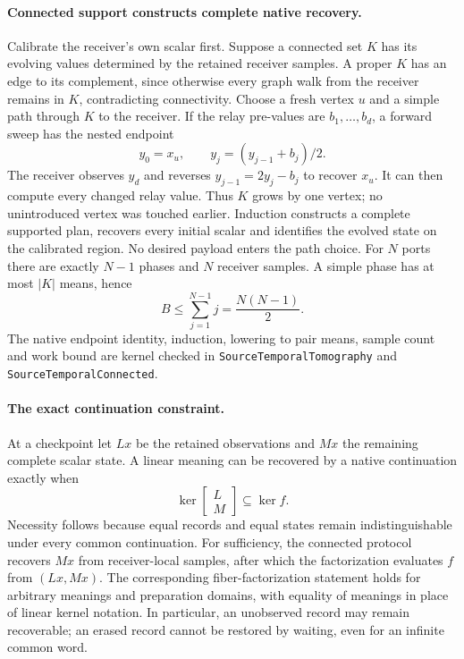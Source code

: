 \paragraph{Connected support constructs complete native recovery.}
Calibrate the receiver's own scalar first. Suppose a connected set $K$ has
its evolving values determined by the retained receiver samples. A proper
$K$ has an edge to its complement, since otherwise every graph walk from
the receiver remains in $K$, contradicting connectivity. Choose a fresh
vertex $u$ and a simple path through $K$ to the receiver. If the relay
pre-values are $b_1,\ldots,b_d$, a forward sweep has the nested endpoint
\[
 y_0=x_u,\qquad y_j=(y_{j-1}+b_j)/2.
\]
The receiver observes $y_d$ and reverses $y_{j-1}=2y_j-b_j$ to recover $x_u$.
It can then compute every changed relay value. Thus $K$ grows by one vertex;
no unintroduced vertex was touched earlier. Induction constructs a complete
supported plan, recovers every initial scalar and identifies the evolved
state on the calibrated region. No desired payload enters the path choice.
For $N$ ports there are exactly $N-1$ phases and $N$ receiver samples.
A simple phase has at most $|K|$ means, hence
\[
 B\leq\sum_{j=1}^{N-1}j=\frac{N(N-1)}2.
\]
The native endpoint identity, induction, lowering to pair means, sample count
and work bound are kernel checked in \texttt{SourceTemporalTomography} and
\texttt{SourceTemporalConnected}.

\paragraph{The exact continuation constraint.}
At a checkpoint let $Lx$ be the retained observations and $Mx$ the remaining
complete scalar state. A linear meaning can be recovered by a native
continuation exactly when
\[
 \ker\begin{bmatrix}L\\M\end{bmatrix}\subseteq\ker f.
\]
Necessity follows because equal records and equal states remain
indistinguishable under every common continuation. For sufficiency, the
connected protocol recovers $Mx$ from receiver-local samples, after which
the factorization evaluates $f$ from $(Lx,Mx)$. The corresponding
fiber-factorization statement holds for arbitrary meanings and preparation
domains, with equality of meanings in place of linear kernel notation.
In particular, an unobserved record may remain recoverable; an erased
record cannot be restored by waiting, even for an infinite common word.

